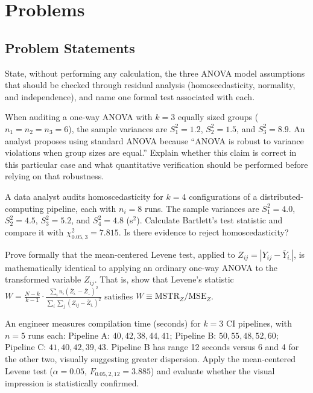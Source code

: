 \section*{Problems}

\subsection*{Problem Statements}

\begin{problema}
\label{prob:aa64893}
State, without performing any calculation, the three ANOVA model assumptions that should be checked through residual analysis (homoscedasticity, normality, and independence), and name one formal test associated with each.
\end{problema}

\begin{problema}
\label{prob:e34d9fb}
When auditing a one-way ANOVA with $k=3$ equally sized groups ($n_1=n_2=n_3=6$), the sample variances are $S_1^2=1.2$, $S_2^2=1.5$, and $S_3^2=8.9$. An analyst proposes using standard ANOVA because ``ANOVA is robust to variance violations when group sizes are equal.'' Explain whether this claim is correct in this particular case and what quantitative verification should be performed before relying on that robustness.
\end{problema}

\begin{problema}
\label{prob:57b555d}
A data analyst audits homoscedasticity for $k=4$ configurations of a distributed-computing pipeline, each with $n_i=8$ runs. The sample variances are $S_1^2=4.0$, $S_2^2=4.5$, $S_3^2=5.2$, and $S_4^2=4.8$ (s$^2$). Calculate Bartlett's test statistic and compare it with $\chi^2_{0.05,3}=7.815$. Is there evidence to reject homoscedasticity?
\end{problema}

\begin{problema}
\label{prob:e2546e4}
Prove formally that the mean-centered Levene test, applied to $Z_{ij}=|Y_{ij}-\bar Y_{i.}|$, is mathematically identical to applying an ordinary one-way ANOVA to the transformed variable $Z_{ij}$. That is, show that Levene's statistic $W=\frac{N-k}{k-1}\cdot\frac{\sum_i n_i(\bar Z_{i.}-\bar Z_{..})^2}{\sum_i\sum_j(Z_{ij}-\bar Z_{i.})^2}$ satisfies $W\equiv\text{MSTR}_Z/\text{MSE}_Z$.
\end{problema}

\begin{problema}
\label{prob:8dd2466}
An engineer measures compilation time (seconds) for $k=3$ CI pipelines, with $n=5$ runs each: Pipeline A: $40,42,38,44,41$; Pipeline B: $50,55,48,52,60$; Pipeline C: $41,40,42,39,43$. Pipeline B has range 12 seconds versus 6 and 4 for the other two, visually suggesting greater dispersion. Apply the mean-centered Levene test ($\alpha=0.05$, $F_{0.05,2,12}=3.885$) and evaluate whether the visual impression is statistically confirmed.
\end{problema}

